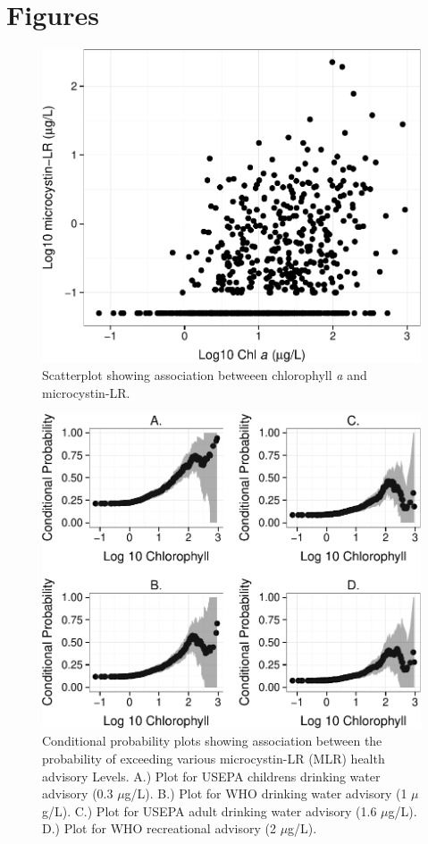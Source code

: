 \documentclass[11pt,]{article}
\begin{document}
\newpage

\section{Figures}\label{figures}

\begin{figure}[htbp]
\centering
\includegraphics{manuscript_files/figure-latex/chla_micro_scatter-1.pdf}
\caption{Scatterplot showing association betweeen chlorophyll \textit{a}
and microcystin-LR. \label{fig:chla_micro_scatter}}
\end{figure}

\newpage

\begin{figure}[htbp]
\centering
\includegraphics{manuscript_files/figure-latex/epa_child_cp_plot-1.pdf}
\caption{Conditional probability plots showing association between the
probability of exceeding various microcystin-LR (MLR) health advisory
Levels. A.) Plot for USEPA childrens drinking water advisory (0.3
\(\mu\)g/L). B.) Plot for WHO drinking water advisory (1 \(\mu\)g/L).
C.) Plot for USEPA adult drinking water advisory (1.6 \(\mu\)g/L). D.)
Plot for WHO recreational advisory (2 \(\mu\)g/L).
\label{fig:multi_cp_plot}}
\end{figure}
\end{document}

